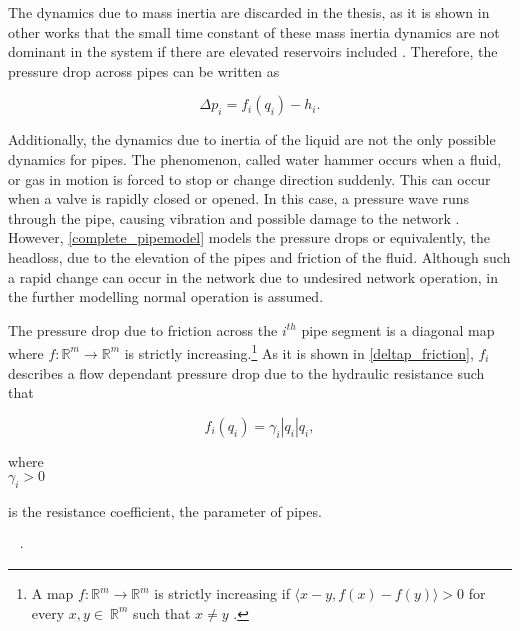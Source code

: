 The dynamics due to mass inertia are discarded in the thesis, as it is shown in other works that the small time constant of these mass inertia dynamics are not dominant in the system if there are elevated reservoirs included \cite{8thsemester_project,kenneth_houe}. Therefore, the pressure drop across pipes can be written as

\begin{equation}
\label{complete_pipemodel1}
  \Delta p_i = f_i(q_i) - h_i.
\end{equation}

Additionally, the dynamics due to inertia of the liquid are not the only possible dynamics for pipes. The phenomenon, called water hammer occurs when a fluid, or gas in motion is forced to stop or change direction suddenly. This can occur when a valve is rapidly closed or opened. In this case, a pressure wave runs through the pipe, causing vibration and possible damage to the network \cite{2011water}. However, \eqref{complete_pipemodel} models the pressure drops or equivalently, the headloss, due to the elevation of the pipes and friction of the fluid. Although such a rapid change can occur in the network due to undesired network operation, in the further modelling normal operation is assumed.

The pressure drop due to friction across the $i^{th}$ pipe segment is a diagonal map where $f: \mathbb{R}^{m} \rightarrow \mathbb{R}^{m} $ is strictly increasing.\footnote{A map $f: \mathbb{R}^{m} \rightarrow \mathbb{R}^{m} $ is strictly increasing if $\langle x-y, f(x)-f(y) \rangle > 0$ for every $x,y \in \: \mathbb{R}^{m}$ such that $x \neq y$ \cite{oneinput_paper}.} As it is shown in \eqref{deltap_friction}, $f_i$ describes a flow dependant pressure drop due to the hydraulic resistance such that

\begin{equation}
  \label{deltap_friction}
  f_i(q_i) = \gamma_i |q_i|q_i,
\end{equation}

 \begin{minipage}[t]{0.20\textwidth}
where\\
\hspace*{8mm} $\gamma_i > 0$ 
\end{minipage}
\begin{minipage}[t]{0.68\textwidth}
\vspace*{2mm}
is the resistance coefficient, the parameter of pipes. 
\end{minipage}
\begin{minipage}[t]{0.10\textwidth}
\vspace*{2mm}
\textcolor{White}{te}$\unit{\cdot}$
\end{minipage}

